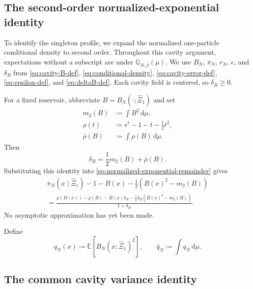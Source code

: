 \documentclass[11pt,reqno]{amsart}
\numberwithin{equation}{section}
\theoremstyle{plain}
\theoremstyle{remark}
\newcommand{\md}{\mathrm{d}}
\newcommand{\E}{{\mathbb{E}}}
\newcommand{\Q}{{\mathbb{Q}}}
\newcommand{\be}{\beta}
\begin{document}
\subsection{The second-order normalized-exponential identity}
\label{subsubsec:exact-profile-normalized-exponential}
To identify the singleton profile, we expand the normalized one-particle conditional density to second order.  Throughout this cavity argument, expectations without a subscript are under $\Q_{N,\be}(\mu)$.  We use $B_N$, $\pi_N$, $r_N$, $\epsilon$, and $\delta_B$ from \eqref{eq:cavity-B-def}, \eqref{eq:conditional-density}, \eqref{eq:cavity-error-def}, \eqref{eq:epsilon-def}, and \eqref{eq:deltaB-def}.  Each cavity field is centered, so $\delta_B\geq0$.

For a fixed reservoir, abbreviate $B=B_N(\cdot;\hat\Xi_1)$ and set
\begin{align}
 m_2(B)&\coloneqq\int B^2\,\md\mu,\label{eq:exact-m2-def}\\
 \rho(t)&\coloneqq e^t-1-t-\frac12t^2,\label{eq:exact-rho-def}\\
 \bar\rho(B)&\coloneqq\int\rho(B)\,\md\mu.\label{eq:exact-rho-bar-def}
\end{align}
Then
\begin{equation}\label{eq:exact-delta-second}
 \delta_B=\frac12m_2(B)+\bar\rho(B).
\end{equation}
Substituting this identity into \eqref{eq:normalized-exponential-remainder} gives
\begin{multline}\label{eq:exact-second-exact-identity}
 \pi_N(x\mid\hat\Xi_1)-1-B(x)
 -\frac12\left(B(x)^2-m_2(B)\right)\\
 =\frac{
 \rho(B(x))-\bar\rho(B)
 -B(x)\delta_B
 -\frac12\delta_B\left(B(x)^2-m_2(B)\right)
 }{1+\delta_B}.
\end{multline}
No asymptotic approximation has yet been made.

Define
\begin{equation}\label{eq:exact-qN-def}
 q_N(x)\coloneqq\E\left[B_N(x;\hat\Xi_1)^2\right],
 \qquad
 \bar q_N\coloneqq\int q_N\,\md\mu.
\end{equation}


\subsection{The common cavity variance identity}
\label{subsec:common-cavity-variance}
\end{document}
